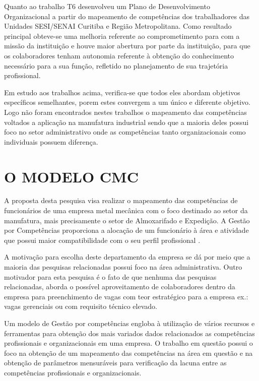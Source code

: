 Quanto ao trabalho T6  desenvolveu um Plano de Desenvolvimento Organizacional a partir do mapeamento de competências dos trabalhadores das Unidades SESI/SENAI Curitiba e Região Metropolitana. Como resultado principal obteve-se uma melhoria referente ao comprometimento para com a missão da instituição e houve maior abertura por parte da instituição, para que os colaboradores tenham autonomia referente à obtenção do conhecimento necessário para a sua função, refletido no planejamento de sua trajetória profissional.

Em estudo aos trabalhos acima, verifica-se que todos eles abordam objetivos específicos semelhantes, porem estes convergem a um único e diferente objetivo. Logo não foram encontrados nestes trabalhos o mapeamento das competências voltados a aplicação na manufatura industrial sendo que a maioria deles possui foco no setor administrativo onde as competências tanto organizacionais como individuais possuem diferença.

\section{O MODELO CMC}

A proposta desta pesquisa visa realizar o mapeamento das competências de funcionários de uma empresa metal mecânica com o foco destinado ao setor da manufatura, mais precisamente o setor de Almoxarifado e Expedição. A Gestão por Competências proporciona a alocação de um funcionário à área e atividade que possui maior compatibilidade com o seu perfil profissional  \cite{rabaglio2012gestao}.

A motivação para escolha deste departamento da empresa se dá por meio que a maioria das pesquisas relacionadas possui foco na área administrativa. Outro motivador para esta pesquisa é o fato de que nenhuma das pesquisas relacionadas, aborda o possível aproveitamento de colaboradores dentro da empresa para preenchimento de vagas com teor estratégico para a empresa ex.: vagas gerenciais ou com requisito técnico elevado.

Um modelo de Gestão por competências engloba à utilização de vários recursos e ferramentas para obtenção dos mais variados dados relacionados as competências profissionais e organizacionais em uma empresa. O trabalho em questão possui o foco na obtenção de um mapeamento das competências na área em questão e na obtenção de parâmetros mensuráveis para verificação da lacuna entre as competências profissionais e organizacionais.


